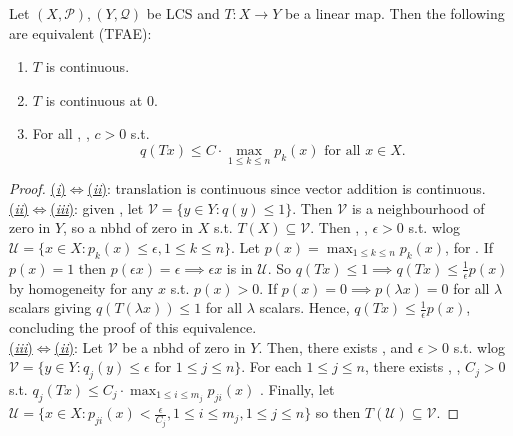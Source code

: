 \documentclass{article}
\begin{document}
\begin{boxlemma}\label{lemma: LCS}
    Let $(X, \mathcal{P}), (Y, \mathcal{Q})$ be LCS and $T:X\to Y$ be a linear map. Then the following are equivalent (TFAE):
    \begin{enumerate}[label=(\roman*)]
        \item $T$ is continuous.
        \item $T$ is continuous at $0$.
        \item For all  \isthere {}, , $c>0$ s.t.\\ 
        $$q(Tx)\leq C\cdot \displaystyle\max_{1\leq k\leq n}p_k(x) \text{ for all }x\in X.$$
    \end{enumerate}
\end{boxlemma}

\begin{proof}
    \noindent\underline{(\textit{i})$\iff$(\textit{ii})}: translation is continuous since vector addition is continuous.\\
    
    \noindent\underline{(\textit{ii})$\iff$(\textit{iii})}: given , let $\mathcal{V}=\{y\in Y:q(y)\leq1\}$. Then $\mathcal{V}$ is a neighbourhood of zero in $Y$, so \isthere a nbhd of zero in $X$ s.t. $T(X)\subseteq \mathcal{V}$. Then \isthere {}, , $\epsilon>0$ s.t. wlog $\mathcal{U}= \{x\in X:p_k(x)\leq\epsilon, 1\leq k\leq n\}$. Let $p(x)= \displaystyle\max_{1\leq k \leq n}p_k(x)$, for . If $p(x)=1$ then $p(\epsilon x)=\epsilon\implies \epsilon x$ is in $\mathcal{U}$. So $q(Tx)\leq 1\implies q(Tx)\leq\frac{1}{\epsilon}p(x)$ by homogeneity for any $x$ s.t. $p(x)>0$. If $p(x)=0\implies p(\lambda x)=0$ for all $\lambda$ scalars giving $q(T(\lambda x))\leq 1$ for all $\lambda$ scalars. Hence, $q(Tx)\leq \frac{1}{\epsilon}p(x)$, concluding the proof of this equivalence.\\

    \noindent\underline{(\textit{iii})$\iff$(\textit{ii})}: Let $\mathcal{V}$ be a nbhd of zero in $Y$. Then, there exists ,  and $\epsilon>0$ s.t. wlog $\mathcal{V}=\{y\in Y:q_j(y)\leq \epsilon \text{ for } 1\leq j\leq n\}$. For each $1\leq j\leq n$, there exists , , $C_j>0$ s.t. $q_j(Tx)\leq C_j\cdot\displaystyle\max_{1\leq i\leq m_j}p_{ji}(x)$ . Finally, let \\
    $\mathcal{U}=\{x\in X:p_{ji}(x)<\frac{\epsilon}{C_j}, 1\leq i\leq m_j, 1\leq j\leq n\}$ so then $T(\mathcal{U})\subseteq \mathcal{V}$.
\end{proof}
\end{document}
